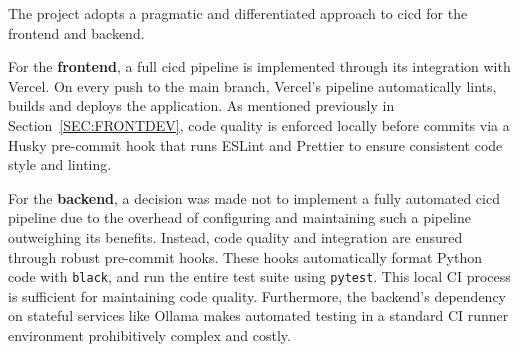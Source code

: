 The project adopts a pragmatic and differentiated approach to \acs{cicd} for the frontend and backend.

For the \textbf{frontend}, a full \acs{cicd} pipeline is implemented through its integration with Vercel. On every push to the main branch, Vercel's pipeline automatically lints, builds and deploys the application. As mentioned previously in Section~\ref{SEC:FRONTDEV}, code quality is enforced locally before commits via a Husky pre-commit hook that runs ESLint and Prettier to ensure consistent code style and linting.

For the \textbf{backend}, a decision was made not to implement a fully automated \acs{cicd} pipeline due to the overhead of configuring and maintaining such a pipeline outweighing its benefits. Instead, code quality and integration are ensured through robust pre-commit hooks. These hooks automatically format Python code with \texttt{black}, and run the entire test suite using \texttt{pytest}. This local CI process is sufficient for maintaining code quality. Furthermore, the backend's dependency on stateful services like Ollama makes automated testing in a standard CI runner environment prohibitively complex and costly.
